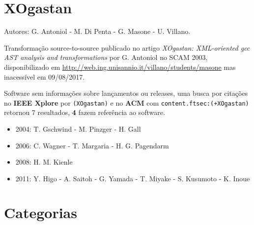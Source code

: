 \section{XOgastan}

Autores:
G. Antoniol - M. Di Penta - G. Masone - U. Villano.

Transformação source-to-source
publicado no artigo {\it XOgastan: XML-oriented gcc AST analysis and transformations}
por G. Antoniol
no SCAM 2003,
disponibilizado em \url{http://web.ing.unisannio.it/villano/students/masone}
mas inacessível em 09/08/2017.

Software sem informações sobre lançamentos ou releases,
uma busca por citações no {\bf IEEE Xplore} por
\texttt{(XOgastan)}
e no {\bf ACM} com
\texttt{content.ftsec:(+XOgastan)}
retornou
7 resultados,
{\bf 4} fazem referência ao software.

\begin{itemize}
\item 2004: T. Gschwind - M. Pinzger - H. Gall
\item 2006: C. Wagner - T. Margaria - H. G. Pagendarm
\item 2008: H. M. Kienle
\item 2011: Y. Higo - A. Saitoh - G. Yamada - T. Miyake - S. Kusumoto - K. Inoue
\end{itemize}


\section{Categorias}



